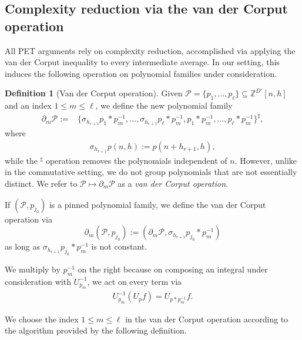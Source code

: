 \documentclass[11pt]{amsart}
\theoremstyle{definition}
\newtheorem{definition}[lemma]{Definition}
\newcommand{\Z}{{\mathbb Z}}
\newcommand{\CP}{{\mathcal P}}
\newcommand{\inv}{^{-1}}
\newcommand{\1}{{\mathbf{1}}}
\begin{document}
\subsection{Complexity reduction via the van der Corput operation}

All PET arguments rely on complexity reduction, accomplished via applying the van der Corput inequality to every intermediate average. In our setting, this induces the following operation on polynomial families under consideration.
\begin{definition}[Van der Corput operation]\label{D: vdC operation}
Given $\CP= \{p_1, \ldots, p_\ell\}\subseteq\Z^{D'}[n, h]$ and an index $1\leq m\leq \ell$, we define the new polynomial family
      \begin{align*}
            \partial_m\CP := &\{\sigma_{h_{r+1}}{p}_1 *{p}_m\inv, \ldots, \sigma_{h_{r+1}}{p}_\ell * {p}_m\inv, {p}_1*{p}_m\inv, \ldots,  {p}_\ell*{p}_m\inv\}^\sharp,
      \end{align*}
      where
           \begin{align*}
          \sigma_{h_{r+1}}p(n, h) := p(n+h_{r+1}, h),
      \end{align*} while the $^\sharp$ operation removes the polynomials independent of $n$.
      However, unlike in the commutative setting, we do not group polynomials that are not essentially distinct.
     We refer to $\CP\mapsto \partial_m \CP$ as a \textit{van der Corput operation}.  

     If $(\CP, p_{j_0})$ is a pinned polynomial family, we define the van der Corput operation via 
     $$\partial_{m}(\mathcal{P},p_{j_0}):=(\partial_{m}\mathcal{P},\sigma_{h_{r+1}}p_{j_0}\ast p_{m}^{-1})$$ as long as $\sigma_{h_{r+1}}p_{j_0}\ast p_{m}^{-1}$ is not constant.
     \end{definition}
     

We multiply by $p_m\inv$ on the right because on composing an integral under consideration with $U_{p_m}\inv$, we act on every term via
\begin{align*}
    U_{p_m}\inv (U_p f) %
    = U_{p*p_m\inv}f.
\end{align*}

       We choose the index $1\leq m\leq \ell$ in the van der Corput operation according to the algorithm provided by the following definition.
\end{document}
